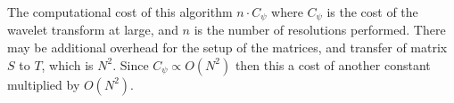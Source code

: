 The computational cost of this algorithm $n\cdot C_\psi$  where $C_\psi$ is the cost of the wavelet transform at large, and $n$ is the number of resolutions performed.  There may be additional overhead for the setup of the matrices, and transfer of matrix $S$ to $T$, which is $N^2$.  Since $C_\psi \propto O(N^2)$ then this a cost of another constant multiplied by $O(N^2)$.














